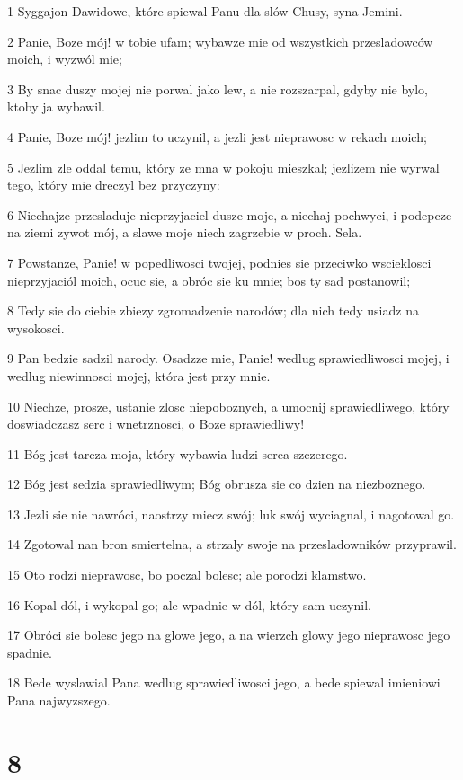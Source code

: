 \par 1 Syggajon Dawidowe, które spiewal Panu dla slów Chusy, syna Jemini.
\par 2 Panie, Boze mój! w tobie ufam; wybawze mie od wszystkich przesladowców moich, i wyzwól mie;
\par 3 By snac duszy mojej nie porwal jako lew, a nie rozszarpal, gdyby nie bylo, ktoby ja wybawil.
\par 4 Panie, Boze mój! jezlim to uczynil, a jezli jest nieprawosc w rekach moich;
\par 5 Jezlim zle oddal temu, który ze mna w pokoju mieszkal; jezlizem nie wyrwal tego, który mie dreczyl bez przyczyny:
\par 6 Niechajze przesladuje nieprzyjaciel dusze moje, a niechaj pochwyci, i podepcze na ziemi zywot mój, a slawe moje niech zagrzebie w proch. Sela.
\par 7 Powstanze, Panie! w popedliwosci twojej, podnies sie przeciwko wscieklosci nieprzyjaciól moich, ocuc sie, a obróc sie ku mnie; bos ty sad postanowil;
\par 8 Tedy sie do ciebie zbiezy zgromadzenie narodów; dla nich tedy usiadz na wysokosci.
\par 9 Pan bedzie sadzil narody. Osadzze mie, Panie! wedlug sprawiedliwosci mojej, i wedlug niewinnosci mojej, która jest przy mnie.
\par 10 Niechze, prosze, ustanie zlosc niepoboznych, a umocnij sprawiedliwego, który doswiadczasz serc i wnetrznosci, o Boze sprawiedliwy!
\par 11 Bóg jest tarcza moja, który wybawia ludzi serca szczerego.
\par 12 Bóg jest sedzia sprawiedliwym; Bóg obrusza sie co dzien na niezboznego.
\par 13 Jezli sie nie nawróci, naostrzy miecz swój; luk swój wyciagnal, i nagotowal go.
\par 14 Zgotowal nan bron smiertelna, a strzaly swoje na przesladowników przyprawil.
\par 15 Oto rodzi nieprawosc, bo poczal bolesc; ale porodzi klamstwo.
\par 16 Kopal dól, i wykopal go; ale wpadnie w dól, który sam uczynil.
\par 17 Obróci sie bolesc jego na glowe jego, a na wierzch glowy jego nieprawosc jego spadnie.
\par 18 Bede wyslawial Pana wedlug sprawiedliwosci jego, a bede spiewal imieniowi Pana najwyzszego.

\chapter{8}

